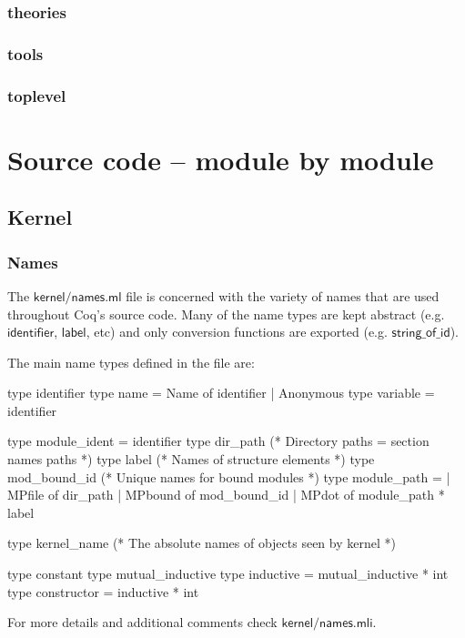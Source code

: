 \documentclass[a4paper,oneside]{book}
\newcommand{\m}[1]{\ensuremath{\mathsf{#1}}}
\begin{document}
\subsection{theories}
\subsection{tools}
\subsection{toplevel}

\chapter{Source code -- module by module}

\section{Kernel}

\subsection{Names}

The \m{kernel/names.ml} file is concerned with the variety of names
that are used throughout Coq's source code. Many of the name types are
kept abstract (e.g. \m{identifier}, \m{label}, etc) and only
conversion functions are exported (e.g. \m{string\_of\_id}).

The main name types defined in the file are:

\begin{code}
type identifier
type name = Name of identifier | Anonymous
type variable = identifier

type module_ident = identifier
type dir_path       (* Directory paths = section names paths *)
type label          (* Names of structure elements *)
type mod_bound_id   (* Unique names for bound modules *)
type module_path =
  | MPfile of dir_path
  | MPbound of mod_bound_id
  | MPdot of module_path * label

type kernel_name     (* The absolute names of objects seen by kernel *)

type constant
type mutual_inductive
type inductive = mutual_inductive * int
type constructor = inductive * int
\end{code}

\noindent
For more details and additional comments check \m{kernel/names.mli}. \\
\end{document}
